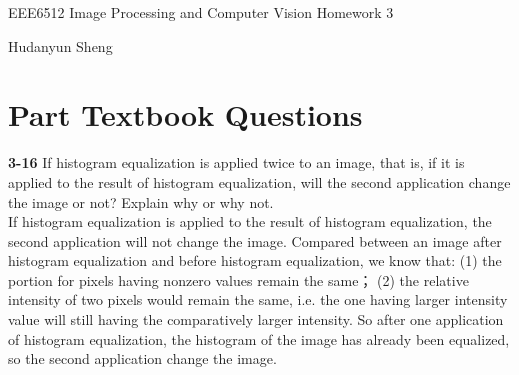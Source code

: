 \documentclass[a4paper]{article}
\begin{document}
\begin{spacing}{2.0}
\begin{flushleft}\begin{huge}EEE6512 Image Processing and Computer Vision   Homework 3\end{huge}\end{flushleft}
\begin{flushright}\begin{Large} Hudanyun Sheng \end{Large}\end{flushright}

\section*{\huge\textbf{ Part \uppercase\expandafter{} Textbook Questions}  }
	\normalsize

	\textbf{3-16} If histogram equalization is applied twice to an image, that is, if it is applied to the result of histogram equalization, will the second application change the image or not? Explain why or why not.\\

	If histogram equalization is applied to the result of histogram equalization, the second application will not change the image. Compared between an image after histogram equalization 		and before histogram equalization, we know that: (1) the portion for pixels having nonzero values remain the same； (2) the relative intensity of two pixels would remain the same,			 i.e. the one having larger intensity value will still having the comparatively larger intensity. So after one application of histogram equalization, the histogram of the image has already 		been equalized, so the second application change the image.\\
	

\end{spacing}
\end{document}
